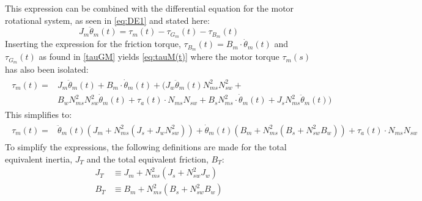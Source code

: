 This expression can be combined with the differential equation for the motor rotational system, as seen in \autoref{eq:DE1} and stated here:
\begin{equation}
J_m\ddot\theta_m(t) = \tau_m(t) -\tau_{G_m}(t) - \tau_{B_m}(t) \nonumber
\end{equation}
Inserting the expression for the friction torque, $\tau_{B_m}(t) = B_m \cdot \dot\theta_m(t)$ and $\tau_{G_{m}}(t)$ as found in \autoref{tauGM} yields \autoref{eq:tauM(t)} where the motor torque $\tau_m(s)$ has also been isolated:\vspace{0.3 cm}
%
\begin{align}
\begin{split}
\tau_m(t) = &J_m\ddot\theta_m(t) + B_m \cdot \dot\theta_m(t)+ ( J_w \ddot\theta_m(t) N_{ms}^2 N_{sw}^2 + \\ & B_w N_{ms}^2 N_{sw}^2\dot\theta_m(t) + \tau_a(t)\cdot N_{ms} N_{sw} + B_s N_{ms}^2 \cdot \dot\theta_m(t) + J_s N_{ms}^2 \ddot\theta_m(t) )
\end{split}
\label{eq:tauM(t)}
\end{align}
This simplifies to:
\begin{align}
\begin{split}
\tau_m(t) = &\ddot\theta_m(t)\left(J_m + N_{ms}^2(J_s  + J_w N_{sw}^2) \right) + \dot\theta_m(t)\left(B_m + N_{ms}^2(B_s + N_{sw}^2 B_w)\right) + \tau_a(t)\cdot N_{ms} N_{sw}
\end{split}
\label{eq:tauM(t)2}
\end{align}
To simplify the expressions, the following definitions are made for the total equivalent inertia, $J_T$ and the total equivalent friction, $B_T$:
\begin{align}
J_{T} &\equiv J_m + N_{ms}^2(J_s + N_{sw}^2 J_w)\label{TotalInertia}\\
B_{T} &\equiv B_m + N_{ms}^2(B_s + N_{sw}^2 B_w)\label{TotalDamper}
\end{align}


